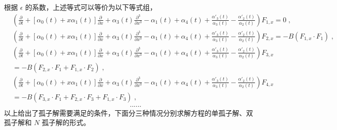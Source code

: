 根据 $\epsilon$ 的系数，上述等式可以等价为以下等式组，
\begin{align}
&(\frac{\partial}{\partial t}+[\alpha _0(t)+x \alpha _1(t)]\frac{\partial}{\partial x}+\alpha _3(t) \frac{\partial^{3}}{\partial x^{3}}- \alpha _1(t)+ \alpha _4(t)+\frac{\alpha' _3(t)}{\alpha _3(t)}
-\frac{\alpha' _2(t)}{\alpha _2(t)})F_{1,x}=0\;, \label{kdv-271}
 \\
&(\frac{\partial}{\partial t}+[\alpha _0(t)+x \alpha _1(t)]\frac{\partial}{\partial x}+ \alpha _3(t)\frac{\partial^{3}}{\partial x^{3}}- \alpha _1(t)+ \alpha _4(t)+\frac{\alpha' _3(t)}{\alpha _3(t)}
-\frac{\alpha' _2(t)}{\alpha _2(t)})F_{2,x}
=-B(F_{1,x} \cdot F_{1})\;,
 \label{kdv-272}
 \\ \nonumber
&(\frac{\partial}{\partial t}+[\alpha _0(t)+x \alpha _1(t)]\frac{\partial}{\partial x}+\alpha _3(t) \frac{\partial^{3}}{\partial x^{3}}- \alpha _1(t)+ \alpha _4(t)+\frac{\alpha' _3(t)}{\alpha _3(t)}
-\frac{\alpha' _2(t)}{\alpha _2(t)})F_{3,x}
 \\
&=-B( F_{2,x} \cdot F_{1}+F_{1,x} \cdot F_{2})\;,\label{kdv-273}
  \\ \nonumber
&(\frac{\partial}{\partial t}+[\alpha _0(t)+x \alpha _1(t)]\frac{\partial}{\partial x} + \alpha _3(t) \frac{\partial^{3}}{\partial x^{3}}
- \alpha _1(t)+ \alpha _4(t)+\frac{\alpha' _3(t)}{\alpha _3(t)}-\frac{\alpha' _2(t)}{\alpha _2(t)})F_{4,x}
\\
&=-B( F_{3,x} \cdot F_{1}+F_{2,x} \cdot F_{3}+F_{1,x} \cdot F_{3})\;,\label{kdv-274}
\\
&\qquad\qquad\qquad\qquad\qquad\qquad\qquad \qquad  \quad ...... \nonumber
\end{align}
以上给出了孤子解需要满足的条件，下面分三种情况分别求解方程的单孤子解、双孤子解和 $N$ 孤子解的形式。

\vspace{1mm}
\vspace{2mm}

